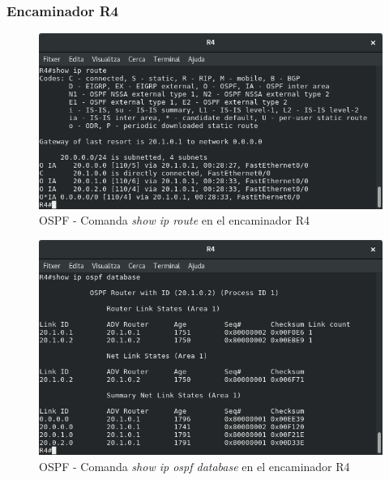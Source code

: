 \documentclass[10pt]{article}
\begin{document}
\subsubsection{Encaminador R4}
\begin{figure}[H]
\begin{center}
\includegraphics[scale=0.5]{Images/ospf-R4-route.png}
\caption{OSPF - Comanda \textit{show ip route} en el encaminador R4}
\end{center}
\end{figure}
\begin{figure}[H]
\begin{center}
\includegraphics[scale=0.5]{Images/ospf-R4-database.png}
\caption{OSPF - Comanda \textit{show ip ospf database} en el encaminador R4}
\end{center}
\end{figure}
\end{document}
